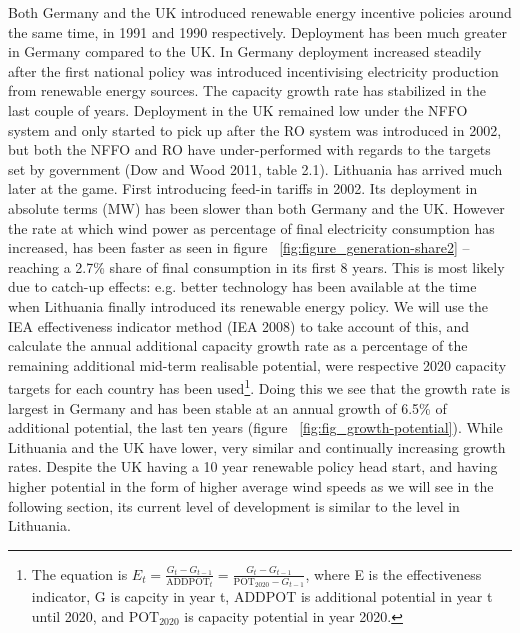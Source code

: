 \documentclass[a4paper, 12pt]{article}
\begin{document}


Both Germany and the UK introduced renewable energy incentive policies around the same time, in 1991 and 1990 respectively. Deployment has been much greater in Germany compared to the UK. In Germany deployment increased steadily after the first national policy was introduced incentivising electricity production from renewable energy sources. The capacity growth rate has stabilized in the last couple of years. Deployment in the UK remained low under the NFFO system and only started to pick up after the RO system was introduced in 2002, but both the NFFO and RO have under-performed with regards to the targets set by government (Dow and Wood 2011, table 2.1). Lithuania has arrived much later at the game. First introducing feed-in tariffs in 2002. Its deployment in absolute terms (MW) has been slower than both Germany and the UK. However the rate at which wind power as percentage of final electricity consumption has increased, has been faster as seen in figure ~\ref{fig:figure_generation-share2} – reaching a 2.7\% share of final consumption in its first 8 years. This is most likely due to catch-up effects: e.g. better technology has been available at the time when Lithuania finally introduced its renewable energy policy. We will use the IEA effectiveness indicator method (IEA 2008) to take account of this, and calculate the annual additional capacity growth rate as a percentage of the remaining additional mid-term realisable potential, were respective 2020 capacity targets for each country has been used\footnote{The equation is $E_t = \frac{G_t - G_{t-1}}{\text{ADDPOT}_t} = \frac{G_t - G_{t-1}}{\text{POT}_{2020} - G_{t-1}}$, where E is the effectiveness indicator, G is capcity in year t, ADDPOT is additional potential in year t until 2020, and $\text{POT}_{2020}$ is capacity potential in year 2020.}.  Doing this we see that the growth rate is largest in Germany and has been stable at an annual growth of 6.5\% of additional potential, the last ten years (figure ~\ref{fig:fig_growth-potential}). While Lithuania and the UK have lower, very similar and continually increasing growth rates. Despite the UK having a 10 year renewable policy head start, and having higher potential in the form of higher average wind speeds as we will see in the following section, its current level of development is similar to the level in Lithuania.
\end{document}
